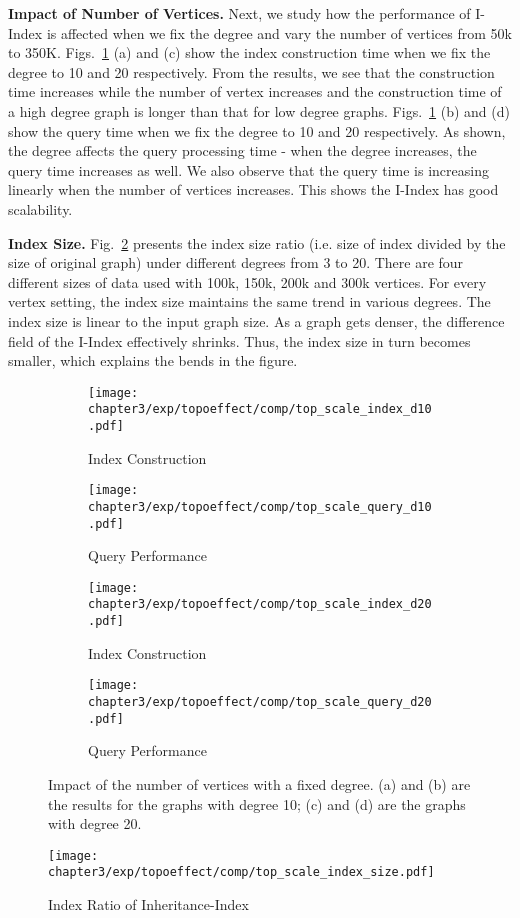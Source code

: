 \textbf{Impact of Number of Vertices.} Next, we study how the performance of I-Index 
 is affected when we fix the degree and vary the number of vertices from 50k to 350K. 
Figs.~\ref{fig:pi_effect2} (a) and (c) show the index construction time when we fix the degree to 
10 and 20 respectively. From the results, we see that the construction time increases while the number of vertex increases and the construction time of a high degree graph is longer than that for low degree graphs. Figs.~\ref{fig:pi_effect2} (b) and (d) show the query time when we fix the degree to 10 and 20 respectively. 
As shown, the degree affects the query processing time - when the degree increases, the query time increases as well. We also observe that the query time is increasing linearly when the number of vertices increases. This shows the I-Index has good scalability.  

\textbf{Index Size.} Fig.~\ref{fig:top-index-size} presents
the index size ratio (i.e. size of index divided by the size of original graph) under different degrees from 3 to 20. 
There are four different sizes of data used with 100k, 150k, 200k and 300k vertices.  
For every vertex setting, the index size maintains the same trend in various degrees. The index size is linear to the input graph size. 
As a graph gets denser, the difference field of the I-Index
effectively shrinks. Thus, the index size in turn becomes smaller, which explains the bends in the figure.

\begin{figure}
\centering
\begin{subfigure}{0.48\linewidth}
  \centering
  \texttt{[image: chapter3/exp/topoeffect/comp/top\_scale\_index\_d10.pdf]}
  \caption{Index Construction }
\end{subfigure}
\begin{subfigure}{0.48\linewidth}
  \centering
  \texttt{[image: chapter3/exp/topoeffect/comp/top\_scale\_query\_d10.pdf]}
  \caption{Query Performance}
\end{subfigure}
\begin{subfigure}{0.48\linewidth}
  \centering
  \texttt{[image: chapter3/exp/topoeffect/comp/top\_scale\_index\_d20.pdf]}
  \caption{Index Construction}
\end{subfigure}
\begin{subfigure}{0.48\linewidth}
  \centering
  \texttt{[image: chapter3/exp/topoeffect/comp/top\_scale\_query\_d20.pdf]}
  \caption{Query Performance}
\end{subfigure}
\caption{Impact of the number of vertices with a fixed degree. (a) and (b) 
are the results for the graphs with degree 10; (c) and (d) 
are the graphs with degree 20. }
\label{fig:pi_effect2}
\end{figure}

\begin{figure}[h]
\centering
\texttt{[image: chapter3/exp/topoeffect/comp/top\_scale\_index\_size.pdf]}
\caption{Index Ratio of Inheritance-Index}
\label{fig:top-index-size}
\end{figure}


